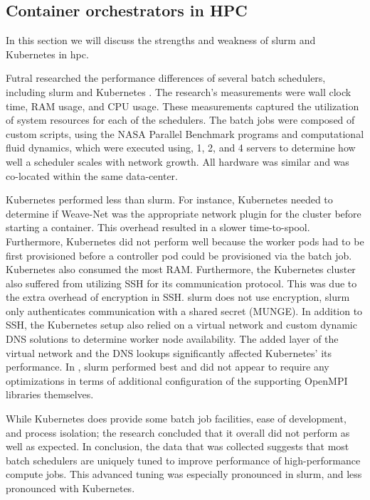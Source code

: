 \documentclass[conference]{IEEEtran}
\begin{document}
\subsection{Container orchestrators in HPC}
\label{containers_hpc}
In this section we will discuss the strengths and weakness of \gls{slurm} and Kubernetes in \gls{hpc}.

Futral researched the performance differences of several batch schedulers, including \gls{slurm} and Kubernetes \cite{futral2019method}. The research's measurements were wall clock time, RAM usage, and CPU usage. These measurements captured the utilization of system resources for each of the schedulers. The batch jobs were composed of custom scripts, using the NASA Parallel Benchmark programs and computational fluid dynamics, which were executed using, 1, 2, and 4 servers to determine how well a scheduler scales with network growth. All hardware was similar and was co-located within the same data-center.

Kubernetes performed less than \gls{slurm}. For instance, Kubernetes needed to determine if Weave-Net was the appropriate network plugin for the cluster before starting a container. This overhead resulted in a slower time-to-spool. Furthermore, Kubernetes did not perform well because the worker pods had to be first provisioned before a controller pod could be provisioned via the batch job. Kubernetes also consumed the most RAM. Furthermore, the Kubernetes cluster also suffered from utilizing SSH for its communication protocol. This was due to the extra overhead of encryption in SSH. \gls{slurm} does not use encryption, \gls{slurm} only authenticates communication with a shared secret (MUNGE). In addition to SSH, the Kubernetes setup also relied on a virtual network and custom dynamic DNS solutions to determine worker node availability. The added layer of the virtual network and the DNS lookups significantly affected Kubernetes' its performance. In \cite{futral2019method}, \gls{slurm} performed best and did not appear to require any optimizations in terms of additional configuration of the supporting OpenMPI libraries themselves.

While Kubernetes does provide some batch job facilities, ease of development, and process isolation; the research concluded that it overall did not perform as well as expected. In conclusion, the data that was collected suggests that most batch schedulers are uniquely tuned to improve performance of high-performance compute jobs. This advanced tuning was especially pronounced in \gls{slurm}, and less pronounced with Kubernetes.
\end{document}
